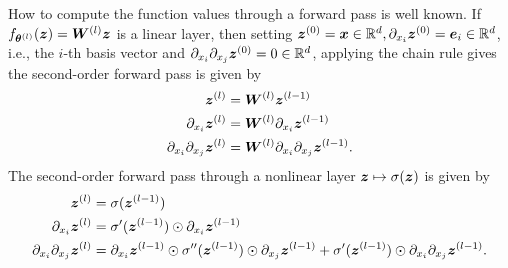 How to compute the function values through a forward pass is well known.
If $f_{\vtheta^{(l)}}(\vz) = \mW^{(l)} \vz %
$ is a linear layer, then setting ${\bm{z}}^{(0)} = {\bm{x}}\in\mathbb R^d, \partial_{x_i}{\bm{z}}^{(0)} = {\bm{e}}_i\in\mathbb R^d$, i.e., the $i$-th basis vector and $\partial_{x_i}\partial_{x_j}{\bm{z}}^{(0)} = 0\in\mathbb R^d$, applying the chain rule gives the second-order forward pass is given by
\begin{subequations}\label{eq:forward_pass}
    \begin{align}
    \vz^{(l)} & = \mW^{(l)} \vz^{(l-1)} %
    \\
    \partial_{x_i} \vz^{(l)} & = \mW^{(l)} \partial_{x_i} \vz^{(l-1)} \\
    \partial_{x_i}\partial_{x_j} \vz^{(l)} & = \mW^{(l)} \partial_{x_i}\partial_{x_j} \vz^{(l-1)} \label{subeq:secondOrderForward-LinearLayer}.
\end{align}
\end{subequations}
The second-order forward pass through a nonlinear layer ${\bm{z}}\mapsto \sigma({\bm{z}})$ is given by
\begin{subequations}
    \begin{align}
    {\bm{z}}^{(l)} & = \sigma({\bm{z}}^{(l-1)}) \\
    \partial_{x_i} {\bm{z}}^{(l)} & = \sigma'({\bm{z}}^{(l-1)}) \odot \partial_{x_i} {\bm{z}}^{(l-1)} \\
    \partial_{x_i}\partial_{x_j} {\bm{z}}^{(l)} & = \partial_{x_i} {\bm{z}}^{(l-1)} \odot \sigma''({\bm{z}}^{(l-1)}) \odot \partial_{x_j} {\bm{z}}^{(l-1)} + \sigma'({\bm{z}}^{(l-1)}) \odot \partial_{x_i} \partial_{x_j} {\bm{z}}^{(l-1)} \label{subeq:secondOrderForward-nonlinearLayer}.
\end{align}
\end{subequations}

